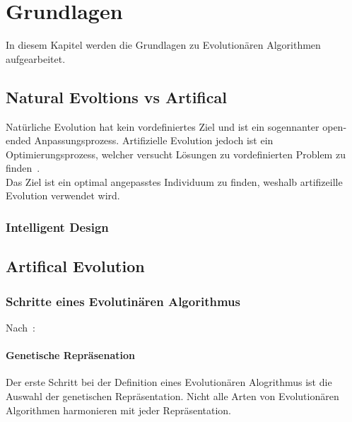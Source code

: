 %
%


\chapter{Grundlagen}

In diesem Kapitel werden die Grundlagen zu Evolutionären Algorithmen aufgearbeitet.

\section{Natural Evoltions vs Artifical}

  Natürliche Evolution hat kein vordefiniertes Ziel und ist ein sogennanter open-ended Anpassungsprozess.
  Artifizielle Evolution jedoch ist ein Optimierungsprozess,
  welcher versucht Lösungen zu vordefinierten Problem zu finden~\cite[S.1]{book:bioInspired}.
  \\
  Das Ziel ist ein optimal angepasstes Individuum zu finden, weshalb artifizeille Evolution verwendet wird.

  \subsection{Intelligent Design\label{sub:IntelligentDesign}}


\section{Artifical Evolution}

  \subsection{Schritte eines Evolutinären Algorithmus\label{sub:stepsEvAlgo}}

    Nach~\cite[S.16 - 29]{book:bioInspired}:
    \\

    \subsubsection{Genetische Repräsenation}

    Der erste Schritt bei der Definition eines Evolutionären Alogrithmus ist die Auswahl der genetischen Repräsentation.
    Nicht alle Arten von Evolutionären Algorithmen harmonieren mit jeder Repräsentation.

